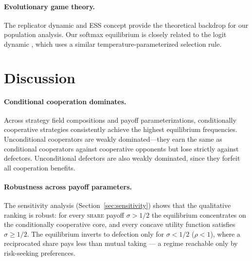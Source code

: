 \documentclass[11pt]{article}
\begin{document}
\paragraph{Evolutionary game theory.}
The replicator dynamic and ESS concept
\citep{maynardsmith1982evolution} provide the theoretical
backdrop for our population analysis.
Our softmax equilibrium is closely related to the logit dynamic
\citep{fudenberg1998theory}, which uses a similar
temperature-parameterized selection rule.


\section{Discussion}
\label{sec:discussion}

\paragraph{Conditional cooperation dominates.}
Across strategy field compositions and payoff parameterizations,
conditionally cooperative strategies consistently achieve the
highest equilibrium frequencies.
Unconditional cooperators are weakly dominated---they earn
the same as conditional cooperators against cooperative opponents
but lose strictly against defectors.
Unconditional defectors are also weakly dominated, since they
forfeit all cooperation benefits.


\paragraph{Robustness across payoff parameters.}
The sensitivity analysis (Section~\ref{sec:sensitivity}) shows that
the qualitative ranking is robust: for every
\textup{\textsc{share}} payoff $\sigma > 1/2$ the equilibrium
concentrates on the conditionally cooperative core, and every
concave utility function satisfies $\sigma \ge 1/2$.
The equilibrium inverts to defection only for $\sigma < 1/2$
($\rho < 1$), where a reciprocated share pays less than mutual
taking --- a regime reachable only by risk-seeking preferences.
\end{document}
